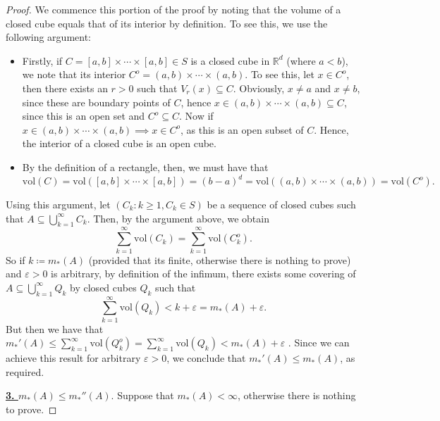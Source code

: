 \begin{proof}
We commence this portion of the proof by noting that the volume of a closed cube equals that of its interior by definition. To see this, we use the following argument:
\begin{itemize}
	\item Firstly, if \( C = [a, b] \times \cdots \times [a, b] \in S \) is a closed cube in \( \mathbb{R}^{d}  \) (where \( a < b \)), we note that its interior \( C^{o} = (a,b) \times \cdots \times (a,b). \) To see this, let \( x \in C^{o} \), then there exists an \( r > 0 \) such that \( V_r(x) \subseteq C \). Obviously, \( x \neq a  \) and \( x \neq b \), since these are boundary points of \( C \), hence \( x \in  (a,b) \times \cdots \times (a,b)  \subseteq C\), since this is an open set and \( C^{o} \subseteq C  \). Now if \( x \in  (a,b) \times \cdots \times (a,b) \implies x \in C^{o}  \), as this is an open subset of \( C \). Hence, the interior of a closed cube is an open cube.
	\item By the definition of a rectangle, then, we must have that \( \mbox{vol}(C) = \mbox{vol}([a,b] \times \cdots \times [a,b]) = (b-a)^{d} = \mbox{vol}((a,b) \times \cdots \times (a,b)) =    \mbox{vol}(C^{o} ).    \) 
\end{itemize}
Using this argument, let \( (C_k : k \geq 1, C_k \in S )\) be a sequence of closed cubes such that \( A \subseteq \bigcup_{k=1}^{\infty} C_k \). Then, by the argument above, we obtain \[\sum_{k=1}^{\infty} \mbox{vol}(C_k) = \sum_{k=1}^{\infty}\mbox{vol}(C_k^{o} ).  \tag{1.2.1} \] So if \( k \coloneqq m_*(A)\) (provided that its finite, otherwise there is nothing to prove) and \(\varepsilon > 0 \) is arbitrary, by definition of the infimum, there exists some covering of \( A \subseteq \bigcup_{k=1}^{\infty}Q_k \) by closed cubes \( Q_k \) such that \[\sum_{k=1}^{\infty}\mbox{vol}(Q_k) < k + \varepsilon  = m_*(A) + \varepsilon . \] But then we have that \( m_*'(A) \leq \sum_{k=1}^{\infty}\mbox{vol}(Q_k^{o}) = \sum_{k=1}^{\infty}\mbox{vol}(Q_k) < m_*(A) + \varepsilon    \) . Since we can achieve this result for arbitrary \( \varepsilon > 0 \), we conclude that \( m_*'(A) \leq m_*(A) \), as required.


\noindent \underline{\textbf{3. \( m_*(A) \leq m_*''(A).\)}} Suppose that \( m_*(A) < \infty \), otherwise there is nothing to prove.


\end{proof}

